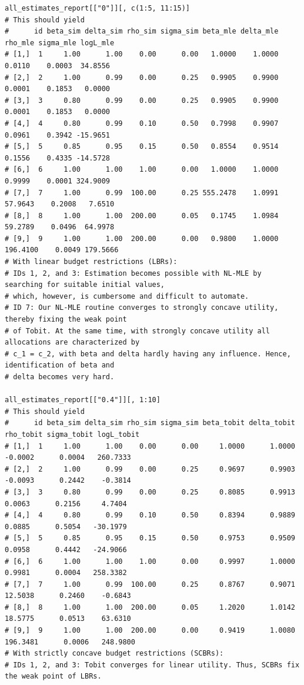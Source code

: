 \begin{lstlisting}
all_estimates_report[["0"]][, c(1:5, 11:15)]
# This should yield
#      id beta_sim delta_sim rho_sim sigma_sim beta_mle delta_mle  rho_mle sigma_mle logL_mle
# [1,]  1     1.00      1.00    0.00      0.00   1.0000    1.0000   0.0110    0.0003  34.8556
# [2,]  2     1.00      0.99    0.00      0.25   0.9905    0.9900   0.0001    0.1853   0.0000
# [3,]  3     0.80      0.99    0.00      0.25   0.9905    0.9900   0.0001    0.1853   0.0000
# [4,]  4     0.80      0.99    0.10      0.50   0.7998    0.9907   0.0961    0.3942 -15.9651
# [5,]  5     0.85      0.95    0.15      0.50   0.8554    0.9514   0.1556    0.4335 -14.5728
# [6,]  6     1.00      1.00    1.00      0.00   1.0000    1.0000   0.9999    0.0001 324.9009
# [7,]  7     1.00      0.99  100.00      0.25 555.2478    1.0991  57.9643    0.2008   7.6510
# [8,]  8     1.00      1.00  200.00      0.05   0.1745    1.0984  59.2789    0.0496  64.9978
# [9,]  9     1.00      1.00  200.00      0.00   0.9800    1.0000 196.4100    0.0049 179.5666
# With linear budget restrictions (LBRs):
# IDs 1, 2, and 3: Estimation becomes possible with NL-MLE by searching for suitable initial values,
# which, however, is cumbersome and difficult to automate.
# ID 7: Our NL-MLE routine converges to strongly concave utility, thereby fixing the weak point
# of Tobit. At the same time, with strongly concave utility all allocations are characterized by
# c_1 = c_2, with beta and delta hardly having any influence. Hence, identification of beta and
# delta becomes very hard.

all_estimates_report[["0.4"]][, 1:10]
# This should yield
#      id beta_sim delta_sim rho_sim sigma_sim beta_tobit delta_tobit rho_tobit sigma_tobit logL_tobit
# [1,]  1     1.00      1.00    0.00      0.00     1.0000      1.0000   -0.0002      0.0004   260.7333
# [2,]  2     1.00      0.99    0.00      0.25     0.9697      0.9903   -0.0093      0.2442    -0.3814
# [3,]  3     0.80      0.99    0.00      0.25     0.8085      0.9913    0.0063      0.2156     4.7404
# [4,]  4     0.80      0.99    0.10      0.50     0.8394      0.9889    0.0885      0.5054   -30.1979
# [5,]  5     0.85      0.95    0.15      0.50     0.9753      0.9509    0.0958      0.4442   -24.9066
# [6,]  6     1.00      1.00    1.00      0.00     0.9997      1.0000    0.9981      0.0004   258.3382
# [7,]  7     1.00      0.99  100.00      0.25     0.8767      0.9071   12.5038      0.2460    -0.6843
# [8,]  8     1.00      1.00  200.00      0.05     1.2020      1.0142   18.5775      0.0513    63.6310
# [9,]  9     1.00      1.00  200.00      0.00     0.9419      1.0080  196.3481      0.0006   248.9800
# With strictly concave budget restrictions (SCBRs):
# IDs 1, 2, and 3: Tobit converges for linear utility. Thus, SCBRs fix the weak point of LBRs.


\end{lstlisting}
